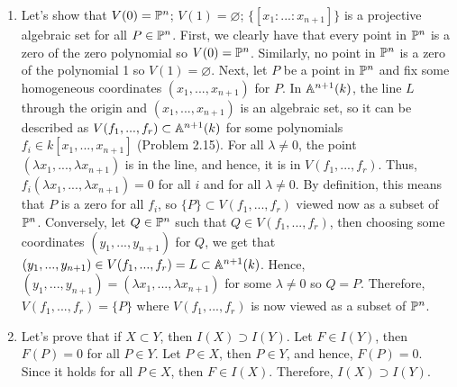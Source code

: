 \begin{solution}
\begin{enumerate}[label = (\arabic*)]
        Let's now prove the more general statement using what we just proved. Let $P \in V(\{FG | F \in I, G \in J\})$, then $(FG)(P) = 0$ for all $F \in I$ and $G \in J$. By the previous proof, it follows that $F(P) = 0$, or $G(P) = 0$. Now, suppose that $P \in V(I)$, then we are done. Otherwise, there is a $F_0 \in I$ such that $F_0(P) \neq 0$. Thus, for all $G \in J$, the equation $(F_0G)(P) = 0$ implies that $F_0(P) = 0$ or $G(P) = 0$, which implies that $G(P) = 0$. Thus, in that case, $P \in V(J)$. Thus, in both cases, $P \in V(I) \cup V(J)$. Conversely, let $P \in V(I) \cup V(J)$ and suppose without loss of generality that $P \in V(I)$, then $F(P) = 0$ for all $F \in I$. It follows that $(FG)(P) = 0$ for all $F \in I$ and $G \in J$. Therefore, $P \in V(\{FG | F \in I, G \in J\})$. Therefore, $V(I) \cup V(J) = V(\{FG | F\in I, G \in J\})$.
        \item Let's show that $V(0) = \P^n$; $V(1) = \varnothing$; $\{[x_1 : ... : x_{n+1}]\}$ is a projective algebraic set for all $P \in \P^n$. First, we clearly have that every point in $\P^n$ is a zero of the zero polynomial so $V(0) = \P^n$. Similarly, no point in $\P^n$ is a zero of the polynomial 1 so $V(1) = \varnothing$. Next, let $P$ be a point in $\P^n$ and fix some homogeneous coordinates $(x_1, ..., x_{n+1})$ for $P$. In $\A^{n+1}(k)$, the line $L$ through the origin and $(x_1, ..., x_{n+1})$ is an algebraic set, so it can be described as $V(f_1, ..., f_r) \subset \A^{n+1}(k)$ for some polynomials $f_i \in k[x_1, ..., x_{n+1}]$ (Problem 2.15). For all $\lambda \neq 0$, the point $(\lambda x_1, ..., \lambda x_{n+1})$ is in the line, and hence, it is in $V(f_1, ..., f_r)$. Thus, $f_i(\lambda x_1, ..., \lambda x_{n+1}) = 0$ for all $i$ and for all $\lambda \neq 0$. By definition, this means that $P$ is a zero for all $f_i$, so $\{P\} \subset V(f_1, ..., f_r)$ viewed now as a subset of $\P^n$. Conversely, let $Q \in \P^n$ such that $Q \in V(f_1, ..., f_r)$, then choosing some coordinates $(y_1, ..., y_{n+1})$ for $Q$, we get that $(y_1, ..., y_{n+1}) \in V(f_1, ..., f_r) = L \subset \A^{n+1}(k)$. Hence, $(y_1, ..., y_{n+1}) = (\lambda x_1, ..., \lambda x_{n+1})$ for some $\lambda \neq 0$ so $Q = P$. Therefore, $V(f_1, ..., f_r) = \{P\}$ where $V(f_1, ..., f_r)$ is now viewed as a subset of $\P^n$.
        \item Let's prove that if $X \subset Y$, then $I(X) \supset I(Y)$. Let $F \in I(Y)$, then $F(P) = 0$ for all $P \in Y$. Let $P \in X$, then $P \in Y$, and hence, $F(P) = 0$. Since it holds for all $P \in X$, then $F \in I(X)$. Therefore, $I(X) \supset I(Y)$.

\end{enumerate}
\end{solution}
